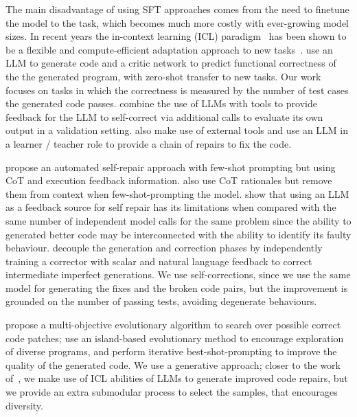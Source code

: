 The main disadvantage of using SFT approaches comes from the need to finetune the model to the task, which becomes much more costly with ever-growing model sizes. In recent years the in-context learning (ICL) paradigm~\citep{brown2020icl} has been shown to be a flexible and compute-efficient adaptation approach to new tasks~\citep{oswald2022iclgrad, akyurek2023ICLlinear}. \citet{le2022coderl} use an LLM to generate code and a critic network to predict functional correctness of the the generated program, with zero-shot transfer to new tasks. Our work focuses on tasks in which the correctness is measured by the number of test cases the generated code passes. \citet{Gou2024critic} combine the use of LLMs with tools to provide feedback for the LLM to self-correct via additional calls to evaluate its own output in a validation setting. \citet{wang2024intervenor} also make use of external tools and use an LLM in a learner / teacher role to provide a chain of repairs to fix the code.

\citet{xin2024thinkrepair} propose an automated self-repair approach with few-shot prompting but using CoT and execution feedback information. \citet{agarwal2024manyshot} also use CoT rationales but remove them from context when few-shot-prompting the model. \citet{olausson2024self} show that using an LLM as a feedback source for self repair has its limitations when compared with the same number of independent model calls for the same problem since the ability to generated better code may be interconnected with the ability to identify its faulty behaviour. \citet{welleck2023selfcorrect} decouple the generation and correction phases by independently training a corrector with scalar and natural language feedback to correct intermediate imperfect generations. We use self-corrections, since we use the same model for generating the fixes and the broken code pairs, but the improvement is grounded on the number of passing tests, avoiding degenerate behaviours.


\citet{yuan2017arja} propose a multi-objective evolutionary algorithm to search over possible correct code patches; \citet{paredes2023funsearch} use an island-based evolutionary method to encourage exploration of diverse programs, and perform iterative best-shot-prompting to improve the quality of the generated code. We use a generative approach; closer to the work of~\citet{shirafuji2023fewshot}, we make use of ICL abilities of LLMs to generate improved code repairs, but we provide an extra submodular process to select the samples, that encourages diversity.